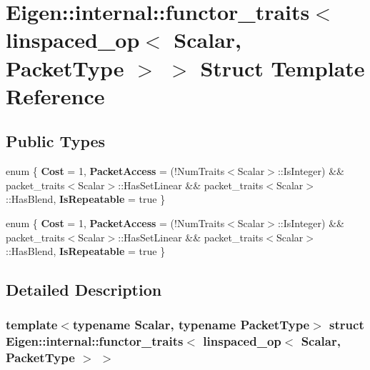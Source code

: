 \hypertarget{struct_eigen_1_1internal_1_1functor__traits_3_01linspaced__op_3_01_scalar_00_01_packet_type_01_4_01_4}{}\section{Eigen\+:\+:internal\+:\+:functor\+\_\+traits$<$ linspaced\+\_\+op$<$ Scalar, Packet\+Type $>$ $>$ Struct Template Reference}
\label{struct_eigen_1_1internal_1_1functor__traits_3_01linspaced__op_3_01_scalar_00_01_packet_type_01_4_01_4}
\subsection*{Public Types}
\begin{DoxyCompactItemize}
\item 
\mbox{\label{struct_eigen_1_1internal_1_1functor__traits_3_01linspaced__op_3_01_scalar_00_01_packet_type_01_4_01_4_af0b538bf7631e9bf1b1097e8dd017613}} 
enum \{ {\bfseries Cost} = 1, 
{\bfseries Packet\+Access} = (!\+Num\+Traits$<$Scalar$>$\+:\+:Is\+Integer) \&\& packet\+\_\+traits$<$Scalar$>$\+:\+:Has\+Set\+Linear \&\& packet\+\_\+traits$<$Scalar$>$\+:\+:Has\+Blend, 
{\bfseries Is\+Repeatable} = true
 \}
\item 
\mbox{\label{struct_eigen_1_1internal_1_1functor__traits_3_01linspaced__op_3_01_scalar_00_01_packet_type_01_4_01_4_a092ef5cc62057780755314eacb2f6857}} 
enum \{ {\bfseries Cost} = 1, 
{\bfseries Packet\+Access} = (!\+Num\+Traits$<$Scalar$>$\+:\+:Is\+Integer) \&\& packet\+\_\+traits$<$Scalar$>$\+:\+:Has\+Set\+Linear \&\& packet\+\_\+traits$<$Scalar$>$\+:\+:Has\+Blend, 
{\bfseries Is\+Repeatable} = true
 \}
\end{DoxyCompactItemize}


\subsection{Detailed Description}
\subsubsection*{template$<$typename Scalar, typename Packet\+Type$>$\newline
struct Eigen\+::internal\+::functor\+\_\+traits$<$ linspaced\+\_\+op$<$ Scalar, Packet\+Type $>$ $>$}



